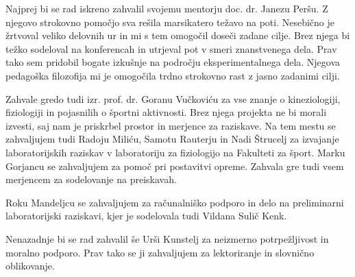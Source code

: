 \zahvalap
Najprej bi se rad iskreno zahvalil svojemu mentorju doc. dr. Janezu Peršu. Z njegovo strokovno pomočjo sva rešila marsikatero težavo na poti. Nesebično je žrtvoval veliko delovnih ur in mi s tem omogočil doseči zadane cilje. Brez njega bi težko sodeloval na konferencah in utrjeval pot v smeri znanstvenega dela. Prav tako sem pridobil bogate izkušnje na področju eksperimentalnega dela. Njegova pedagoška filozofija mi je omogočila trdno strokovno rast z jasno zadanimi cilji.

Zahvale gredo tudi izr. prof. dr. Goranu Vučkoviću za vse znanje o kineziologiji, fiziologiji in pojasnilih o športni aktivnosti. Brez njega projekta ne bi morali izvesti, saj nam je priskrbel prostor in merjence za raziskave. Na tem mestu se zahvaljujem tudi Radoju Miliću, Samotu Rauterju in Nadi Štrucelj za izvajanje laboratorijskih raziskav v laboratoriju za fiziologijo na Fakulteti za šport. Marku Gorjancu se zahvaljujem za pomoč pri postavitvi opreme. Zahvala gre tudi vsem merjencem za sodelovanje na preiskavah. 

Roku Mandeljcu se zahvaljujem za računalniško podporo in delo na preliminarni laboratorijski raziskavi, kjer je sodelovala tudi Vildana Sulič Kenk.

Nenazadnje bi se rad zahvalil še Urši Kunstelj za neizmerno potrpežljivost in moralno podporo. Prav tako se ji zahvaljujem za lektoriranje in slovnično oblikovanje.